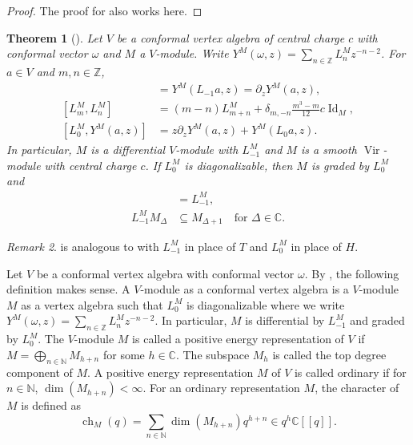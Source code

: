 \documentclass[a4paper, 12pt, reqno]{amsart}
\newtheorem{theorem}{Theorem}[subsection]
\theoremstyle{remark}
\newtheorem{remark}[theorem]{Remark}
\numberwithin{equation}{subsection}
\DeclareMathOperator{\Vir}{Vir}
\DeclareMathOperator{\Id}{Id}
\DeclareMathOperator{\ch}{ch}
\begin{document}
\begin{proof}
  The proof for  also works here.
\end{proof}

\begin{theorem}[{\cite[Proposition 4.1.5 and (4.1.18)]{lepowsky_introduction_2004}}]
  \label{thr:24}
  Let $V$ be a conformal vertex algebra of central charge $c$ with conformal vector $\omega$ and $M$ a $V$-module.
  Write $Y^M(\omega, z) = \sum_{n \in \mathbb{Z}}L^M_nz^{-n - 2}$.
  For $a \in V$ and $m, n \in \mathbb{Z}$,
  \begin{align*}
    [L^M_{-1}, Y^M(a, z)] &= Y^M(L_{-1}a, z) = \partial_zY^M(a, z), \\
    [L^M_m, L^M_n] &=(m - n)L^M_{m + n} + \delta_{m, -n}\frac{m^3 - m}{12}c\Id_M, \\
    [L^M_0, Y^M(a, z)] &= z\partial_zY^M(a, z) + Y^M(L_0a, z).
  \end{align*}
  In particular, $M$ is a differential $V$-module with $L_{-1}^M $ and $M$ is a smooth $\Vir$-module with central charge $c$.
  If $L^M_0$ is diagonalizable, then $M$ is graded by $L_0^M$ and
  \begin{align*}
    [L_0^M,L_{-1}^M]&=L_{-1}^M, \\
    L^M_{-1}M_\Delta&\subseteq M_{\Delta+1} \quad \text{for }\Delta \in \mathbb{C}.
  \end{align*}
\end{theorem}

\begin{remark}
  \label{rmk:21}
   is analogous to  with $L_{-1}^M$ in place of $T$ and $L_0^M$ in place of $H$.
\end{remark}

Let $V$ be a conformal vertex algebra with conformal vector $\omega$.
By , the following definition makes sense.
A $V$-module as a conformal vertex algebra is a $V$-module $M$ as a vertex algebra such that $L^M_0$ is diagonalizable where we write $Y^M(\omega, z) = \sum_{n \in \mathbb{Z}}L^M_nz^{-n - 2}$.
In particular, $M$ is differential by $L^M_{-1}$ and graded by $L^M_0$.
The $V$-module $M$ is called a positive energy representation of $V$ if $M = \bigoplus_{n \in \mathbb{N}}M_{h + n}$ for some $h \in \mathbb{C}$.
The subspace $M_h$ is called the top degree component of $M$.
A positive energy representation $M$ of $V$ is called ordinary if for $n \in \mathbb{N}$, $\dim(M_{h + n}) < \infty$.
For an ordinary representation $M$, the character of $M$ is defined as
\begin{equation*}
  \ch_M(q) = \sum_{n \in \mathbb{N}}\dim(M_{h + n})q^{h + n} \in q^h\mathbb{C}[[q]].
\end{equation*}
\end{document}
